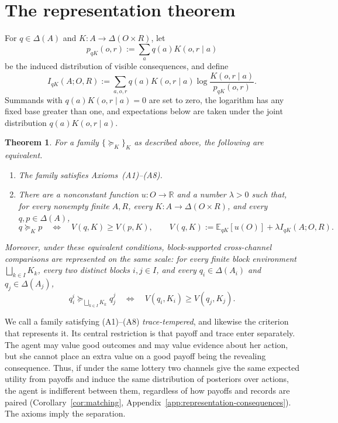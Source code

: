 \documentclass[11pt,a4paper]{article}
\newtheorem{theorem}{Theorem}
\theoremstyle{definition}
\newcommand{\D}{\Delta}
\newcommand{\E}{\mathbb E}
\newcommand{\I}{I}
\newcommand{\1}{\mathbf 1}
\begin{document}
\section{The representation theorem}\label{sec:theorem}

For $q\in\D(A)$ and $K:A\to\D(O\times R)$, let
\[
 p_{qK}(o,r):=\sum_a q(a)K(o,r\mid a)
\]
be the induced distribution of visible consequences, and define
\begin{equation}
 \I_{qK}(A;O,R)
 :=\sum_{a,o,r}q(a)K(o,r\mid a)
 \log\frac{K(o,r\mid a)}{p_{qK}(o,r)}.
 \label{eq:mi}
\end{equation}
Summands with $q(a)K(o,r\mid a)=0$ are set to zero, the logarithm has any fixed base greater than one, and expectations below are
taken under the joint distribution $q(a)K(o,r\mid a)$.

\begin{theorem}\label{thm:main}
For a family $\{\succeq_K\}_K$ as described above, the following are equivalent.
\begin{enumerate}[label=\textup{(\roman*)},leftmargin=*]
\item The family satisfies Axioms~\textup{(A1)--(A8)}.
\item There are a nonconstant function $u:O\to\mathbb R$ and a number $\lambda>0$ such that, for every nonempty
finite $A,R$, every $K:A\to\D(O\times R)$, and every $q,p\in\D(A)$,
\begin{equation}
 q\succeq_Kp
 \quad\Longleftrightarrow\quad
 V(q,K)\ge V(p,K),
 \qquad
 V(q,K):=\E_{qK}[u(O)]+\lambda\I_{qK}(A;O,R).
 \label{eq:representation}
\end{equation}
\end{enumerate}
Moreover, under these equivalent conditions, block-supported cross-channel comparisons are represented on the same
scale: for every finite block environment $\bigsqcup_{k\in I}K_k$, every two distinct blocks $i,j\in I$, and every
$q_i\in\D(A_i)$ and $q_j\in\D(A_j)$,
\[
 q_i^i\succeq_{\bigsqcup_{k\in I}K_k}q_j^j
 \quad\Longleftrightarrow\quad
 V(q_i,K_i)\ge V(q_j,K_j).
\]
\end{theorem}

We call a family satisfying \textup{(A1)--(A8)} \emph{trace-tempered}, and likewise the criterion that
represents it.  Its central restriction is that payoff and trace enter separately.  The agent may value good
outcomes and may value evidence about her action, but she cannot place an extra value on a good payoff being the
revealing consequence.  Thus, if under the same lottery two channels give the same expected utility from payoffs
and induce the same distribution of posteriors over actions, the agent is indifferent between them, regardless of
how payoffs and records are paired (Corollary~\ref{cor:matching}, Appendix~\ref{app:representation-consequences}).  The
axioms imply the separation.
\end{document}
